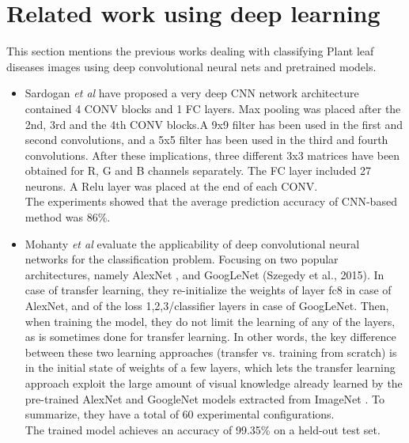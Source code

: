 \section{Related work using deep learning}
This section mentions the previous works dealing with classifying Plant leaf diseases images
using deep convolutional neural nets and pretrained models.
\begin{itemize}
    \item Sardogan \textit{et al} \cite{art33}  have proposed a very deep CNN network architecture contained 4 CONV blocks and 1 FC layers. Max pooling was placed after the 2nd, 3rd and the 4th CONV blocks.A 9x9 filter has been used in the first and second convolutions, and a 5x5 filter has been used in the third and fourth convolutions. After these implications, three different 3x3 matrices have been obtained for R, G and B channels separately. The FC layer included 27 neurons. A Relu layer was placed at the end of each CONV. \\
    The experiments showed that the average prediction accuracy of CNN-based method was 86\%. 
    \item Mohanty \textit{et al} \cite{art34} evaluate the applicability of deep convolutional neural networks for the classification problem. Focusing on two popular architectures, namely AlexNet \cite{art29}, and GoogLeNet (Szegedy et al., 2015). In case of transfer learning, they re-initialize the weights of layer fc8 in case of AlexNet, and of the loss {1,2,3}/classifier layers in case of GoogLeNet. 
    Then, when training the model, they do not limit the learning of any of the layers, as is sometimes done for transfer learning. In other words, the key difference between these two learning approaches (transfer vs. training from scratch) is in the initial state of weights of a few layers, which lets the transfer learning approach exploit the large amount of visual knowledge already learned by the pre-trained AlexNet and GoogleNet models extracted from ImageNet \cite{art31}. To summarize, they have a total of 60 experimental configurations.\\
    The trained model achieves an accuracy of 99.35\% on a held-out test set.

\end{itemize}
